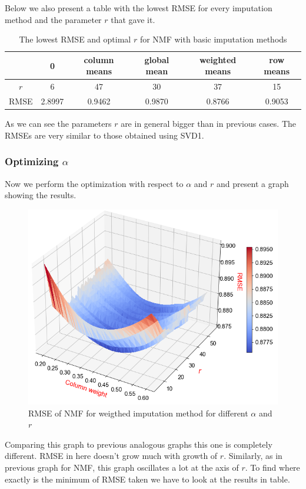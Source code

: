 \documentclass[10pt]{amsart}
\begin{document}
Below we also present a table with the lowest RMSE for every imputation method and the parameter $r$ that gave it.

\begin{table}[H]
\begin{tabular}{c|ccccc}
& 0 & column means & global mean & weighted means & row means \\
\hline
$r$ & 6 & 47 & 30 & 37 & 15\\
RMSE & 2.8997 & 0.9462 & 0.9870 & 0.8766 & 0.9053 \\
\end{tabular}
\caption{The lowest RMSE and optimal $r$ for NMF with basic imputation methods}
\end{table}

As we can see the parameters $r$ are in general bigger than in previous cases.
The RMSEs are very similar to those obtained using SVD1.

\subsubsection*{Optimizing $\alpha$}
Now we perform the optimization with respect to $\alpha$ and $r$ and present a graph showing the results.

\begin{figure}[H]
\includegraphics[scale = 0.54]{nmf_r_w2}
\caption{RMSE of NMF for weigthed imputation method for different $\alpha$ and $r$}
\end{figure}

Comparing this graph to previous analogous graphs this one is completely different.
RMSE in here doesn't grow much with growth of $r$.
Similarly, as in previous graph for NMF, this graph oscillates a lot at the axis of $r$.
To find where exactly is the minimum of RMSE taken we have to look at the results in table.
\end{document}
